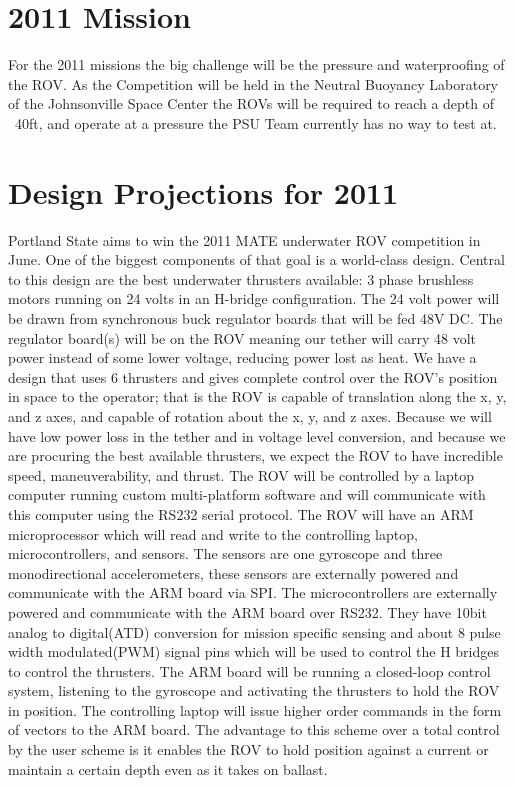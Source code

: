 \documentclass{proposalnsf}
\begin{document}
\newpage

\section{2011 Mission}
For the 2011 missions the big challenge will be the pressure and waterproofing of the ROV.  As the Competition will be held in the Neutral Buoyancy Laboratory of the Johnsonville Space Center
the ROVs will be required to reach a depth of ~40ft, and operate at a pressure the PSU Team currently has no way to test at.


\section{Design Projections for 2011}
Portland State aims to win the 2011 MATE underwater ROV competition in June. One of the biggest components of that goal is a world-class design. Central 
to this design are the best underwater thrusters available: 3 phase brushless motors running on 24 volts in an H-bridge configuration. The 24 volt power 
will be drawn from synchronous buck regulator boards that will be fed 48V DC. The regulator board(s) will be on the ROV meaning our tether will carry 48 
volt power instead of some lower voltage, reducing power lost as heat. We have a design that uses 6 thrusters and gives complete control over the ROV’s 
position in space to the operator; that is the ROV is capable of translation along the x, y, and z axes, and capable of rotation about the x, y, and z axes. 
Because we will have low power loss in the tether and in voltage level conversion, and because we are procuring the best available thrusters, we expect the 
ROV to have incredible speed, maneuverability, and thrust. The ROV will be controlled by a laptop computer running custom multi-platform software and will 
communicate with this computer using the RS232 serial protocol. The ROV will have an ARM microprocessor which will read and write to the controlling laptop, 
microcontrollers, and sensors. The sensors are one gyroscope and three monodirectional accelerometers, these sensors are externally powered and communicate 
with the ARM board via SPI. The microcontrollers are externally powered and communicate with the ARM board over RS232. They have 10bit analog to digital(ATD) 
conversion for mission specific sensing and about 8 pulse width modulated(PWM) signal pins which will be used to control the H bridges to control the thrusters. 
The ARM board will be running a closed-loop control system, listening to the gyroscope and activating the thrusters to hold the ROV in position. The 
controlling laptop will issue higher order commands in the form of vectors to the ARM board. The advantage to this scheme over a total control by the user 
scheme is it enables the ROV to hold position against a current or maintain a certain depth even as it takes on ballast.


\newpage
{}
\renewcommand{\thepage} {E--\arabic{page}}



\end{document}
